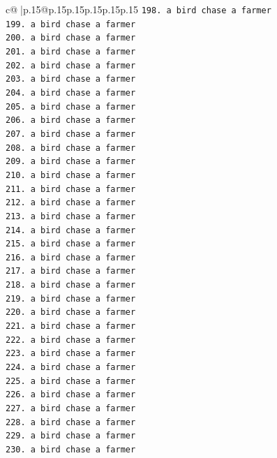 \documentclass{article}
\begin{document}
{\begin{supertabular}{c@{$\;$}|p{.15\linewidth}@{}p{.15\linewidth}p{.15\linewidth}p{.15\linewidth}p{.15\linewidth}p{.15\linewidth}}
{{{\texttt{198. a bird chase a farmer} \\
\texttt{199. a bird chase a farmer} \\
\texttt{200. a bird chase a farmer} \\
\texttt{201. a bird chase a farmer} \\
\texttt{202. a bird chase a farmer} \\
\texttt{203. a bird chase a farmer} \\
\texttt{204. a bird chase a farmer} \\
\texttt{205. a bird chase a farmer} \\
\texttt{206. a bird chase a farmer} \\
\texttt{207. a bird chase a farmer} \\
\texttt{208. a bird chase a farmer} \\
\texttt{209. a bird chase a farmer} \\
\texttt{210. a bird chase a farmer} \\
\texttt{211. a bird chase a farmer} \\
\texttt{212. a bird chase a farmer} \\
\texttt{213. a bird chase a farmer} \\
\texttt{214. a bird chase a farmer} \\
\texttt{215. a bird chase a farmer} \\
\texttt{216. a bird chase a farmer} \\
\texttt{217. a bird chase a farmer} \\
\texttt{218. a bird chase a farmer} \\
\texttt{219. a bird chase a farmer} \\
\texttt{220. a bird chase a farmer} \\
\texttt{221. a bird chase a farmer} \\
\texttt{222. a bird chase a farmer} \\
\texttt{223. a bird chase a farmer} \\
\texttt{224. a bird chase a farmer} \\
\texttt{225. a bird chase a farmer} \\
\texttt{226. a bird chase a farmer} \\
\texttt{227. a bird chase a farmer} \\
\texttt{228. a bird chase a farmer} \\
\texttt{229. a bird chase a farmer} \\
\texttt{230. a bird chase a farmer} \\
}}}
\end{supertabular}}
\end{document}
